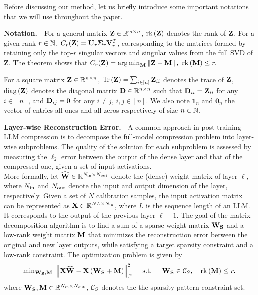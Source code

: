 
Before discussing our method, let us briefly introduce some important notations that we will use throughout the paper.

\textbf{Notation.\,\,\,\,} For a general matrix $\mathbf{Z} \in \mathbb{R}^{m \times n}$, 
$\operatorname{rk}\left({\mathbf{Z}}\right)$ denotes the rank of $\mathbf{Z}$.
For a given rank $r \in \mathbb{N}$, $C_r(\mathbf{Z}) = \mathbf{U}_r \mathbf{\Sigma}_r \mathbf{V}_r^T$, corresponding to the matrices formed by retaining only the top-$r$ singular vectors and singular values from the full SVD of $\mathbf{Z}$. The \citet{eckart1936approximation} theorem shows that $C_r(\bfZ) = \argmin_\bfM \norm{\bfZ - \bfM},\,\, \rk{\bfM} \leq r.$

For a square matrix $\mathbf{Z} \in \mathbb{R}^{n \times n}$,
$\operatorname{Tr}\left({\mathbf{Z}}\right) = \sum_{i \in [n]}\mathbf{Z}_{ii}$ denotes the trace of $\mathbf{Z}$,
$\operatorname{diag}\left({\mathbf{Z}}\right)$ denotes the diagonal matrix $\mathbf{D} \in \mathbb{R}^{n \times n}$ such that $\mathbf{D}_{ii} = \mathbf{Z}_{ii}$ for any $i \in [n]$, and $\mathbf{D}_{ij} = 0$ for any $i \neq j, \, i,j \in [n]$.
We also note $\mathbf{1}_n$ and $\mathbf{0}_n$ the vector of entries all ones and all zeros respectively of size $n \in \mathbb{N}$.

\textbf{Layer-wise Reconstruction Error.\,\,\,\,} 
A common approach in post-training LLM compression is to decompose the full-model compression problem into layer-wise subproblems. The quality of the solution for each subproblem is assessed by measuring the $\ell_2$ error between the output of the dense layer and that of the compressed one, given a set of input activations.\\
More formally, let $\widehat{\mathbf{W}} \in \mathbb{R}^{N_{\text{in}} \times N_{\text{out}}}$ denote the (dense) weight matrix of layer $\ell$, where $N_{\text{in}}$ and $N_{\text{out}}$ denote the input and output dimension of the layer, respectively. Given a set of $N$ calibration samples, the input activation matrix can be represented as $\mathbf{X} \in \mathbb{R}^{NL \times N_{\text{in}}}$, where $L$ is the sequence length of an LLM. It corresponds to the output of the previous layer $\ell - 1$.  The goal of the matrix decomposition algorithm is to find a sum of a sparse weight matrix $\mathbf{W_S}$ and a low-rank weight matrix $\mathbf{M}$ that minimizes the reconstruction error between the original and new layer outputs, while satisfying a target sparsity constraint and a low-rank constraint. The optimization problem is given by
\begin{equation}\label{eq:matrix-decomposition}
       \min\nolimits_{\mathbf{W_S}, \mathbf{M}} \,\, \left\|\mathbf{X} \widehat{\mathbf{W}}-\mathbf{X} \left({\mathbf{W_S} + \mathbf{M}}\right)\right\|_F^2 ~~~~\text{s.t. } ~~~ \mathbf{W_S}\in \mathcal{C}_S, ~~~\operatorname{rk}\left({\mathbf{M}}\right) \leq r.
\end{equation}
where $\mathbf{W_S}, \mathbf{M} \in \mathbb{R}^{N_{\text{in}} \times N_{\text{out}}}$, $\mathcal{C}_S$ denotes the the sparsity-pattern constraint set.